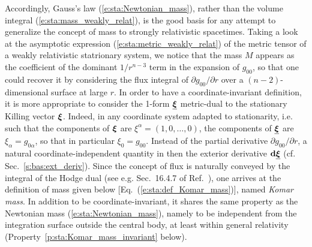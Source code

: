 Accordingly, Gauss's law (\ref{e:sta:Newtonian_mass}), rather than the volume integral
(\ref{e:sta:mass_weakly_relat}), is the good basis for any attempt to
generalize the concept of mass to strongly relativistic spacetimes.
Taking a look at the asymptotic expression (\ref{e:sta:metric_weakly_relat}) of the metric tensor
of a weakly relativistic statrionary system, we notice that
the mass $M$ appears as the coefficient of the dominant $1/r^{n-3}$ term
in the expansion of $g_{00}$, so that one could
recover it by considering the flux integral of $\partial g_{00}/\partial r$ over
a $(n-2)$-dimensional surface at large $r$. In order to have a coordinate-invariant
definition, it is more appropriate to consider the 1-form $\underline{\bm{\xi}}$ metric-dual
to the stationary Killing vector $\bm{\xi}$. Indeed, in any coordinate system
adapted to stationarity, i.e. such that the components of
$\bm{\xi}$ are $\xi^\alpha=(1,0,\ldots,0)$, the components of $\underline{\bm{\xi}}$
are $\xi_\alpha = g_{0\alpha}$, so that in particular $\xi_0 = g_{00}$.
Instead of the partial derivative $\partial g_{00}/\partial r$, a natural coordinate-independent
quantity in then the exterior derivative $\mathbf{d} \underline{\bm{\xi}}$ (cf. Sec.~\ref{s:bas:ext_deriv}). Since the concept of flux
is naturally conveyed by the integral of the Hodge dual (see e.g. Sec.~16.4.7 of Ref.~\cite{Gourg13}), one arrives at the
definition of mass given below [Eq.~(\ref{e:sta:def_Komar_mass})], named \emph{Komar mass}.
In addition to be coordinate-invariant, it shares the same property as the Newtonian mass (\ref{e:sta:Newtonian_mass}),
namely to be independent from the integration surface outside the central body,
at least within general relativity
(Property~\ref{p:sta:Komar_mass_invariant} below).



